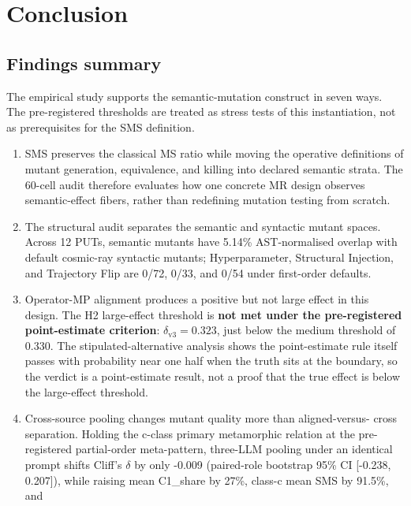 \documentclass[manuscript,screen,review]{acmart}
\begin{document}


\section{Conclusion}\label{conclusion}

\subsection{Findings summary}\label{findings-summary}

The empirical study supports the semantic-mutation construct in seven
ways. The pre-registered thresholds are treated as stress tests of this
instantiation, not as prerequisites for the SMS definition.

\begin{enumerate}
\item
  SMS preserves the classical MS ratio while moving the operative
  definitions of mutant generation, equivalence, and killing into
  declared semantic strata. The 60-cell audit therefore evaluates how
  one concrete MR design observes semantic-effect fibers, rather than
  redefining mutation testing from scratch.
\item
  The structural audit separates the semantic and syntactic mutant
  spaces. Across 12 PUTs, semantic mutants have 5.14\% AST-normalised
  overlap with default cosmic-ray syntactic mutants; Hyperparameter,
  Structural Injection, and Trajectory Flip are 0/72, 0/33, and 0/54
  under first-order defaults.
\item
  Operator-MP alignment produces a positive but not large effect in this
  design. The H2 large-effect threshold is \textbf{not met under the
  pre-registered point-estimate criterion}: \(\delta_{\mathrm{v3}} =
  0.323\), just below the \citet{romano2006cliff} medium threshold of
  0.330. The stipulated-alternative analysis shows the point-estimate rule
  itself passes with probability near one half when the truth sits at
  the boundary, so the verdict is a point-estimate result, not a proof
  that the true effect is below the large-effect threshold.
\item
  Cross-source pooling changes mutant quality more than aligned-versus-
  cross separation. Holding the c-class primary metamorphic relation at
  the pre-registered partial-order meta-pattern, three-LLM pooling under
  an identical prompt
  shifts Cliff's \(\delta\) by only -0.009 (paired-role bootstrap 95\%
  CI {[}-0.238, 0.207{]}), while
  raising mean C1\_share by 27\%, class-c mean SMS by 91.5\%, and

\end{enumerate}
\end{document}
